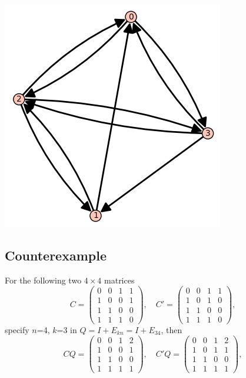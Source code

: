 \documentclass[12pt, a4paper]{article}
\theoremstyle{plain}
\theoremstyle{definition}
\begin{document}
    \begin{center}
    \includegraphics{graph_Cprime.PNG}
    \end{center}



\subsection{Counterexample}
    For the following two $4\times 4$ matrices
    $$C=\begin{pmatrix}
    0 & 0 & 1 & 1\\
    1 & 0 & 0 & 1\\
    1 & 1 & 0 & 0\\
    1 & 1 & 1 & 0
    \end{pmatrix},\quad C'=\begin{pmatrix}
    0 & 0 & 1 & 1\\
    1 & 0 & 1 &  0\\
    1 & 1 & 0 & 0\\
    1 & 1 & 1 & 0
    \end{pmatrix},$$
    specify $n$=4, $k$=3 in $Q = I +E_{kn} = I + E_{34}$, then
    $$CQ=\begin{pmatrix}
    0 & 0 & 1 & 2\\
    1 & 0 & 0 & 1\\
    1 & 1 & 0 & 0\\
    1 & 1 & 1 & 1
    \end{pmatrix},\quad C'Q=\begin{pmatrix}
    0 & 0 & 1 & 2\\
    1 & 0 & 1 & 1\\
    1 & 1 & 0 & 0\\
    1 & 1 & 1 & 1
    \end{pmatrix},$$
\end{document}
